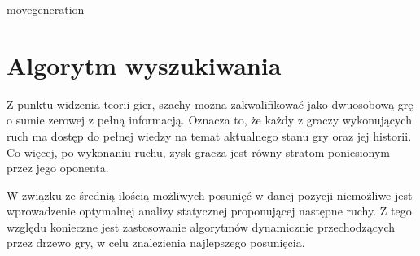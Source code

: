 \newpage
movegeneration
\newpage
\section{Algorytm wyszukiwania}
\label {sec:algorytm-wyszukiwania}

Z punktu widzenia teorii gier, szachy można zakwalifikować jako dwuosobową grę o sumie zerowej z pełną informacją.
Oznacza to, że każdy z graczy wykonujących ruch ma dostęp do pełnej wiedzy na temat aktualnego stanu gry oraz jej historii.
Co więcej, po wykonaniu ruchu, zysk gracza jest równy stratom poniesionym przez jego oponenta.

W związku ze średnią ilością możliwych posunięć w danej pozycji niemożliwe jest wprowadzenie optymalnej analizy statycznej proponującej następne ruchy.
Z tego względu konieczne jest zastosowanie algorytmów dynamicznie przechodzących przez drzewo gry, w celu znalezienia najlepszego posunięcia.



